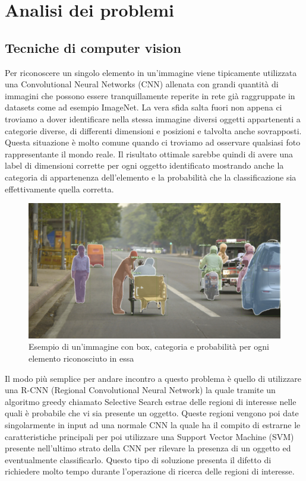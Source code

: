 \section{Analisi dei problemi}
\subsection{Tecniche di computer vision}
Per riconoscere un singolo elemento in un'immagine viene tipicamente utilizzata una Convolutional Neural Networks (CNN) allenata con grandi quantità di immagini che possono essere tranquillamente reperite in rete già raggruppate in datasets come ad esempio ImageNet.
La vera sfida salta fuori non appena ci troviamo a dover identificare nella stessa immagine diversi oggetti appartenenti a categorie diverse, di differenti dimensioni e posizioni e talvolta anche sovrapposti. Questa situazione è molto comune quando ci troviamo ad osservare qualsiasi foto rappresentante il mondo reale. Il risultato ottimale sarebbe quindi di avere una label di dimensioni corrette per ogni oggetto identificato mostrando anche la categoria di appartenenza dell'elemento e la probabilità che la classificazione sia effettivamente quella corretta.
\begin{figure}[H]
	\centering
	\includegraphics[width=0.7\linewidth]{images/Esempio-computer-vision.jpg}
	\caption{Esempio di un'immagine con box, categoria e probabilità per ogni elemento riconosciuto in essa}
	\label{Esempio di un frame di un video in 4K}
\end{figure}
Il modo più semplice per andare incontro a questo problema è quello di utilizzare una R-CNN (Regional Convolutional Neural Network) la quale tramite un algoritmo greedy chiamato Selective Search estrae delle regioni di interesse nelle quali è probabile che vi sia presente un oggetto. Queste regioni vengono poi date singolarmente in input ad una normale CNN la quale ha il compito di estrarne le caratteristiche principali per poi utilizzare una Support Vector Machine (SVM) presente nell'ultimo strato della CNN per rilevare la presenza di un oggetto ed eventualmente classificarlo. Questo tipo di soluzione presenta il difetto di richiedere molto tempo durante l'operazione di ricerca delle regioni di interesse.\\
